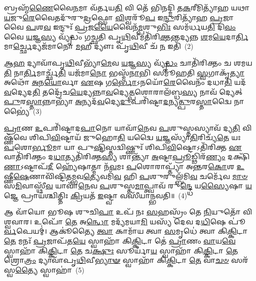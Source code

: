 𑌬𑍍𑌰𑌹𑍍𑌮᳴\-\ul{𑌣𑍈}\-𑌵𑍈\-\ul{𑌨}\-𑌮𑌾 𑌵᳴𑌰𑍍𑌤𑌯\-\ul{𑌤𑌿} 𑌵𑌿 𑌤𑍇᳴ 𑌭𑌿𑌨𑌦𑍍𑌮𑌿 𑌤\-\ul{𑌕}\-𑌰𑍀𑌮𑌿𑌤𑍍𑌯𑌾᳴𑌹 𑌯𑌥𑌾\-\ul{𑌯}\-𑌜𑍁\-\ul{𑌰𑍇}\-𑌵𑍈𑌤𑌦𑍁᳴𑌰𑍁\-\ul{𑌦𑍍𑌰}\-𑌫𑍍𑌸𑍋 \ul{𑌵𑌿}\-𑌶𑍍𑌵𑌰𑍂᳴\-\ul{𑌪} 𑌇\-\ul{𑌨𑍍𑌦𑍁}\-𑌰𑌿𑌤𑍍𑌯𑌾᳴𑌹 \ul{𑌪𑍍𑌰}\-𑌜𑌾 𑌵𑍈 \ul{𑌪}\-𑌶\-\ul{𑌵} 𑌇𑌨𑍍𑌦𑍁𑌃᳴ \ul{𑌪𑍍𑌰}\-𑌜\-\ul{𑌯𑍈}\-𑌵𑍈𑌨᳴\-\ul{𑌮𑍍𑌪}\-𑌶𑍁\-\ul{𑌭𑌿𑌃} 𑌸𑌮᳴𑌰𑍍𑌧𑌯\-\ul{𑌤𑌿} 𑌦𑌿\-\ul{𑌵𑌂} 𑌵𑍈 \ul{𑌯}\-𑌜𑍍𑌞\-\ul{𑌸𑍍𑌯} 𑌵𑍍𑌯𑍃᳴𑌦𑍍𑌧𑌂 𑌗𑌚𑍍𑌛𑌤𑌿 𑌪𑍃\-\ul{𑌥𑌿}\-𑌵𑍀𑌮𑌤𑌿᳴𑌰𑌿\-\ul{𑌕𑍍𑌤}\-𑌨𑍍𑌤𑌦𑍍𑌯𑌨𑍍𑌨 \ul{𑌶}\-𑌮\-\ul{𑌯𑍇}\-𑌦𑌾\-\ul{𑌰𑍍𑌤𑌿}\-𑌮𑌾\-\ul{𑌰𑍍𑌚𑍍𑌛𑍇}\-𑌦𑍍𑌯𑌜᳴𑌮𑌾𑌨𑍋 \ul{𑌮}\-𑌹𑍀 𑌦𑍍𑌯𑍗𑌃 𑌪𑍃᳴\-\ul{𑌥𑌿}\-𑌵𑍀 𑌚᳴ \ul{𑌨} 𑌇𑌤𑌿᳴~(2)

\-\ul{𑌆}\-\-\ul{𑌹} 𑌦𑍍𑌯𑌾𑌵𑌾᳴𑌪𑍃\-\ul{𑌥𑌿}\-𑌵𑍀𑌭𑍍𑌯𑌾᳴\-\ul{𑌮𑍇}\-𑌵 \ul{𑌯}\-𑌜𑍍𑌞\-\ul{𑌸𑍍𑌯} 𑌵𑍍𑌯𑍃᳴\-\ul{𑌦𑍍𑌧𑌂} 𑌚𑌾𑌤𑌿᳴𑌰𑌿𑌕𑍍𑌤𑌂 𑌚 𑌶𑌮𑌯\-\ul{𑌤𑌿} 𑌨𑌾\-\ul{𑌰𑍍𑌤𑌿}\-𑌮𑌾𑌰𑍍𑌚𑍍𑌛᳴\-\ul{𑌤𑌿} 𑌯𑌜᳴𑌮𑌾\-\ul{𑌨𑍋} 𑌭𑌸𑍍𑌮᳴\-\ul{𑌨𑌾}\-𑌭𑌿 𑌸𑌮𑍂᳴𑌹𑌤𑌿 \ul{𑌸𑍍𑌵}\-𑌗𑌾𑌕𑍃᳴\-\ul{𑌤𑍍𑌯𑌾} 𑌅𑌥𑍋᳴ \ul{𑌅}\-𑌨\-\ul{𑌯𑍋}\-𑌰𑍍𑌵𑌾 \ul{𑌏}\-𑌷 𑌗\-\ul{𑌰𑍍𑌭𑍋}\-\-𑌽𑌨𑌯𑍋᳴\-\ul{𑌰𑍇}\-𑌵𑍈𑌨𑌂᳴ 𑌦𑌧𑌾\-\ul{𑌤𑌿} 𑌯𑌦᳴\-\ul{𑌵}\-𑌦𑍍𑌯𑍇𑌦\-\ul{𑌤𑌿} 𑌤𑌦𑍍𑌰𑍇᳴𑌚\-\ul{𑌯𑍇}\-𑌦𑍍𑌯𑌨𑍍𑌨𑌾\-\ul{𑌵}\-𑌦𑍍𑌯𑍇\-\ul{𑌤𑍍𑌪}\-𑌶𑍋𑌰𑌾𑌲᳴𑌬𑍍𑌧\-\ul{𑌸𑍍𑌯} 𑌨𑌾𑌵᳴ 𑌦𑍍𑌯𑍇𑌤𑍍 \ul{𑌪𑍁}\-𑌰\-\ul{𑌸𑍍𑌤𑌾}\-𑌨𑍍𑌨𑌾𑌭𑍍𑌯𑌾᳴ \ul{𑌅}\-𑌨𑍍𑌯𑌦᳴\-\ul{𑌵}\-𑌦𑍍𑌯𑍇\-\ul{𑌦𑍁}\-𑌪𑌰𑌿᳴𑌷𑍍𑌟𑌾\-\ul{𑌦}\-𑌨𑍍𑌯\-\ul{𑌤𑍍𑌪𑍁}\-𑌰\-\ul{𑌸𑍍𑌤𑌾}\-𑌦𑍍𑌵𑍈 𑌨𑌾𑌭𑍍𑌯𑍈॑~(3)

\-\ul{𑌪𑍍𑌰𑌾}\-𑌣 \ul{𑌉}\-𑌪𑌰𑌿᳴𑌷𑍍𑌟𑌾𑌦\-\ul{𑌪𑌾}\-𑌨𑍋 𑌯𑌾𑌵𑌾᳴\-\ul{𑌨𑍇}\-𑌵 \ul{𑌪}\-𑌶𑍁𑌸𑍍𑌤𑌸𑍍𑌯𑌾𑌵᳴ 𑌦𑍍𑌯\-\ul{𑌤𑌿} 𑌵𑌿𑌷𑍍𑌣᳴𑌵𑍇 𑌶𑌿𑌪𑌿\-\ul{𑌵𑌿}\-𑌷𑍍𑌟𑌾𑌯᳴ 𑌜𑍁𑌹𑍋\-\ul{𑌤𑌿} 𑌯𑌦𑍍𑌵𑍈 \ul{𑌯}\-𑌜𑍍𑌞𑌸𑍍𑌯𑌾᳴\-\ul{𑌤𑌿}\-𑌰𑌿𑌚𑍍𑌯᳴\-\ul{𑌤𑍇} 𑌯𑌃 \ul{𑌪}\-𑌶𑍋\-\ul{𑌰𑍍𑌭𑍂}\-𑌮𑌾 𑌯𑌾 𑌪𑍁\-\ul{𑌷𑍍𑌟𑌿}\-𑌸𑍍𑌤𑌦𑍍𑌵𑌿𑌷𑍍𑌣𑍁𑌃᳴ 𑌶𑌿𑌪𑌿\-\ul{𑌵𑌿}\-𑌷𑍍𑌟𑍋\-𑌽𑌤𑌿᳴𑌰𑌿𑌕𑍍𑌤 \ul{𑌏}\-𑌵𑌾𑌤𑌿᳴𑌰𑌿𑌕𑍍𑌤𑌂 𑌦\-\ul{𑌧𑌾}\-𑌤𑍍𑌯𑌤𑌿᳴𑌰𑌿𑌕𑍍𑌤\-\ul{𑌸𑍍𑌯} 𑌶𑌾𑌨𑍍𑌤𑍍𑌯𑌾᳴ \ul{𑌅}\-𑌷𑍍𑌟𑌾\-\ul{𑌪𑍍𑌰𑍂}\-𑌡𑍍𑌢𑌿𑌰᳴\-\ul{𑌣𑍍𑌯𑌂} 𑌦𑌕𑍍𑌷𑌿᳴\-\ul{𑌣𑌾}\-\-𑌽𑌷𑍍𑌟𑌾𑌪᳴\-\ul{𑌦𑍀} 𑌹𑍍𑌯𑍇᳴𑌷𑌾𑌤𑍍𑌮𑌾 𑌨᳴\-\ul{𑌵}\-𑌮𑌃 \ul{𑌪}\-𑌶𑍋𑌰𑌾𑌪𑍍𑌤𑍍𑌯𑌾᳴ 𑌅𑌨𑍍𑌤𑌰\-\ul{𑌕𑍋}\-𑌶 \ul{𑌉}\-𑌷𑍍𑌣𑍀\-\ul{𑌷𑍇}\-𑌣𑌾𑌵𑌿᳴𑌷𑍍𑌟𑌿𑌤𑌮𑍍𑌭𑌵\-\ul{𑌤𑍍𑌯𑍇}\-𑌵𑌮𑌿᳴\-\ul{𑌵} 𑌹𑌿 \ul{𑌪}\-𑌶𑍁𑌰𑍁𑌲𑍍𑌬᳴𑌮𑌿\-\ul{𑌵} 𑌚𑌰𑍍𑌮𑍇᳴𑌵 \ul{𑌮𑌾}\-\-\ul{𑍞}\-𑌸\-\ul{𑌮𑌿}\-𑌵𑌾𑌸𑍍𑌥𑍀᳴\-\ul{𑌵} 𑌯𑌾𑌵𑌾᳴\-\ul{𑌨𑍇}\-𑌵 \ul{𑌪}\-𑌶𑍁𑌸𑍍𑌤\-\ul{𑌮𑌾}\-𑌪𑍍𑌤𑍍𑌵𑌾𑌵᳴ 𑌰𑍁\-\ul{𑌨𑍍𑌦𑍍𑌧𑍇} 𑌯\-\ul{𑌸𑍍𑌯𑍈}\-𑌷𑌾 \ul{𑌯}\-𑌜𑍍𑌞𑍇 𑌪𑍍𑌰𑌾𑌯᳴𑌶𑍍𑌚𑌿𑌤𑍍𑌤𑌿𑌃 \ul{𑌕𑍍𑌰𑌿}\-𑌯𑌤᳴ \ul{𑌇}\-𑌷𑍍𑌟𑍍𑌵𑌾 𑌵𑌸𑍀᳴𑌯𑌾𑌨𑍍𑌭𑌵𑌤𑌿॥~(4)

{\anuvakamend[{\-\ul{𑌵}\-\-\ul{𑌰𑍍𑌤}\-𑌯𑍇𑌤𑍍𑌯𑌾᳴𑌹 \ul{𑌨} 𑌇\-\ul{𑌤𑌿} 𑌵𑍈 𑌨𑌾\-\ul{𑌭𑍍𑌯𑌾} 𑌉𑌲𑍍𑌬᳴\-\ul{𑌮𑌿}\-𑌵𑍈𑌕᳴𑌵𑌿𑍞𑌶𑌤𑌿𑌶𑍍𑌚}]}%

𑌆 𑌵𑌾᳴𑌯𑍋 𑌭𑍂𑌷 𑌶𑍁𑌚𑌿\-\ul{𑌪𑌾} 𑌉𑌪᳴ 𑌨𑌃 \ul{𑌸}\-𑌹𑌸𑍍𑌰𑌂᳴ 𑌤𑍇 \ul{𑌨𑌿}\-𑌯𑍁𑌤𑍋᳴ 𑌵𑌿𑌶𑍍𑌵𑌵𑌾𑌰। 𑌉𑌪𑍋᳴ \ul{𑌤𑍇} 𑌅\-\ul{𑌨𑍍𑌧𑍋} 𑌮𑌦𑍍𑌯᳴𑌮𑌯𑌾\-\ul{𑌮𑌿} 𑌯𑌸𑍍𑌯᳴ 𑌦𑍇𑌵 𑌦\-\ul{𑌧𑌿}\-𑌷𑍇 𑌪𑍂॑\-\ul{𑌰𑍍𑌵}\-𑌪𑍇𑌯𑌮𑍍॑। 𑌆𑌕𑍂॑𑌤𑍍𑌯𑍈 \ul{𑌤𑍍𑌵𑌾} 𑌕𑌾𑌮𑌾᳴𑌯 𑌤𑍍𑌵𑌾 \ul{𑌸}\-𑌮𑍃𑌧𑍇॑ 𑌤𑍍𑌵𑌾 𑌕𑌿\-\ul{𑌕𑍍𑌕𑌿}\-𑌟𑌾 \ul{𑌤𑍇} 𑌮𑌨𑌃᳴ \ul{𑌪𑍍𑌰}\-𑌜𑌾𑌪᳴𑌤\-\ul{𑌯𑍇} 𑌸𑍍𑌵𑌾𑌹𑌾᳴ 𑌕𑌿\-\ul{𑌕𑍍𑌕𑌿}\-𑌟𑌾 𑌤𑍇॑ \ul{𑌪𑍍𑌰𑌾}\-𑌣𑌂 \ul{𑌵𑌾}\-𑌯\-\ul{𑌵𑍇} 𑌸𑍍𑌵𑌾𑌹𑌾᳴ 𑌕𑌿\-\ul{𑌕𑍍𑌕𑌿}\-𑌟𑌾 \ul{𑌤𑍇} 𑌚\-\ul{𑌕𑍍𑌷𑍁𑌃} 𑌸𑍂𑌰𑍍𑌯𑌾᳴\-\ul{𑌯} 𑌸𑍍𑌵𑌾𑌹𑌾᳴ 𑌕𑌿\-\ul{𑌕𑍍𑌕𑌿}\-𑌟𑌾 \ul{𑌤𑍇} 𑌶𑍍𑌰𑍋\-\ul{𑌤𑍍𑌰𑌂} 𑌦𑍍𑌯𑌾𑌵𑌾᳴𑌪𑍃\-\ul{𑌥𑌿}\-𑌵𑍀\-\ul{𑌭𑍍𑌯𑌾}\-\-\ul{𑍟} 𑌸𑍍𑌵𑌾𑌹𑌾᳴ 𑌕𑌿\-\ul{𑌕𑍍𑌕𑌿}\-𑌟𑌾 \ul{𑌤𑍇} 𑌵𑌾\-\ul{𑌚}\-\-\ul{𑍞} 𑌸𑌰᳴𑌸𑍍𑌵\-\ul{𑌤𑍍𑌯𑍈} 𑌸𑍍𑌵𑌾𑌹𑌾॑~(5)

